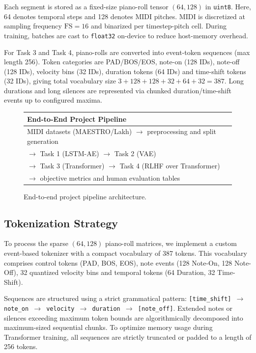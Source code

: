 \documentclass[conference]{IEEEtran}
\begin{document}
Each segment is stored as a fixed-size piano-roll tensor $(64,128)$ in \texttt{uint8}. Here, 64 denotes temporal steps and 128 denotes MIDI pitches. MIDI is discretized at sampling frequency $\mathrm{FS}=16$ and binarized per timestep-pitch cell. During training, batches are cast to \texttt{float32} on-device to reduce host-memory overhead.

For Task 3 and Task 4, piano-rolls are converted into event-token sequences (max length 256). Token categories are PAD/BOS/EOS, note-on (128 IDs), note-off (128 IDs), velocity bins (32 IDs), duration tokens (64 IDs) and time-shift tokens (32 IDs), giving total vocabulary size $3+128+128+32+64+32=387$. Long durations and long silences are represented via chunked duration/time-shift events up to configured maxima.

\begin{figure}[htbp]
\centering
\footnotesize
\begin{tabular}{|l|}
\hline
\textbf{End-to-End Project Pipeline} \\
\hline
MIDI datasets (MAESTRO/Lakh) $\rightarrow$ preprocessing and split generation \\
$\rightarrow$ Task 1 (LSTM-AE) $\rightarrow$ Task 2 (VAE) \\
$\rightarrow$ Task 3 (Transformer) $\rightarrow$ Task 4 (RLHF over Transformer) \\
$\rightarrow$ objective metrics and human evaluation tables \\
\hline
\end{tabular}
\caption{End-to-end project pipeline architecture.}
\label{fig:pipeline-overview}
\normalsize
\end{figure}

\subsection{Tokenization Strategy}
To process the sparse $(64, 128)$ piano-roll matrices, we implement a custom event-based tokenizer with a compact vocabulary of 387 tokens. This vocabulary comprises control tokens (PAD, BOS, EOS), note events (128 Note-On, 128 Note-Off), 32 quantized velocity bins and temporal tokens (64 Duration, 32 Time-Shift).

Sequences are structured using a strict grammatical pattern: \texttt{[time\_shift] $\rightarrow$ note\_on $\rightarrow$ velocity $\rightarrow$ duration $\rightarrow$ [note\_off]}. Extended notes or silences exceeding maximum token bounds are algorithmically decomposed into maximum-sized sequential chunks. To optimize memory usage during Transformer training, all sequences are strictly truncated or padded to a length of 256 tokens.
\end{document}
